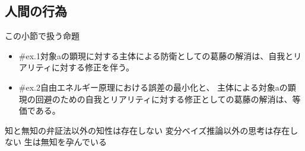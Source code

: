 \subsection{人間の行為}\label{ux4ebaux9593ux306eux884cux70ba}

\begin{note}{この小節で扱う命題}
  \begin{itemize}
    \tightlist
    \item{\#ex.1}対象aの顕現に対する主体による防衛としての葛藤の解消は、自我とリアリティに対する修正を伴う。
    \item{\#ex.2}自由エネルギー原理における誤差の最小化と、  主体による対象aの顕現の回避のための自我とリアリティに対する修正としての葛藤の解消は、等価である。
  \end{itemize}
\end{note}

知と無知の弁証法以外の知性は存在しない
変分ベイズ推論以外の思考は存在しない 生は無知を孕んでいる
